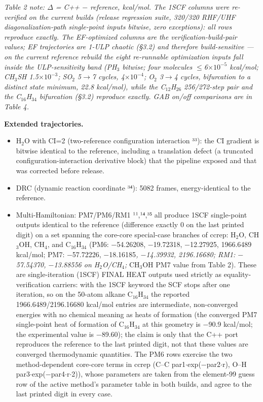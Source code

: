 \documentclass[preprint,12pt]{elsarticle}
\begin{document}
\textit{Table 2 note: $\Delta$ = C++ $-$ reference, kcal/mol. The 1SCF columns were re-verified on the current builds (release regression suite, 320/320 RHF/UHF diagonalization-path single-point inputs bitwise, zero exceptions): all rows reproduce exactly. The EF-optimized columns are the verification-build-pair values; EF trajectories are 1-ULP chaotic (\S{}3.2) and therefore build-sensitive --- on the current reference rebuild the eight re-runnable optimization inputs fall inside the ULP-sensitivity band (PH$_{3}$ bitwise; four molecules $\leq$6$\times$$10^{-5}$ kcal/mol; CH$_{3}$SH 1.5$\times$$10^{-3}$; SO$_{2}$ 5$\rightarrow$7 cycles, 4$\times$$10^{-4}$; O$_{2}$ 3$\rightarrow$4 cycles, bifurcation to a distinct state minimum, 22.8 kcal/mol), while the C$_{12}$H$_{26}$ 256/272-step pair and the C$_{16}$H$_{34}$ bifurcation (\S{}3.2) reproduce exactly. GAB on/off comparisons are in Table 4.}

\textbf{Extended trajectories.}

\begin{itemize}
\item H$_{2}$O with CI=2 (two-reference configuration interaction ³³): the CI gradient is bitwise identical to the reference, including a translation defect (a truncated configuration-interaction derivative block) that the pipeline exposed and that was corrected before release.
\item DRC (dynamic reaction coordinate ³⁴): 5082 frames, energy-identical to the reference.
\item Multi-Hamiltonian: PM7/PM6/RM1 ¹¹,¹⁴,³⁵ all produce 1SCF single-point outputs identical to the reference (difference exactly 0 on the last printed digit) on a set spanning the core-core special-case branches of ccrep: H$_{2}$O, CH$_{3}$OH, CH$_{4}$, and C$_{16}$H$_{34}$ (PM6: $-$54.26208, $-$19.72318, $-$12.27925, 1966.6489 kcal/mol; PM7: $-$57.72226, $-$18.16185\textit{, $-$14.39932, 2196.16680; RM1: $-$57.54370, $-$13.88556 on H$_{2}$O/CH$_{4}$; }CH$_{3}$OH PM7 value from Table 2). These are single-iteration (1SCF) FINAL HEAT outputs used strictly as equality-verification carriers: with the 1SCF keyword the SCF stops after one iteration, so on the 50-atom alkane C$_{16}$H$_{34}$ the reported 1966.6489/2196.16680 kcal/mol entries are intermediate, non-converged energies with no chemical meaning as heats of formation (the converged PM7 single-point heat of formation of C$_{16}$H$_{34}$ at this geometry is $-$90.9 kcal/mol; the experimental value is $-$89.60); the claim is only that the C++ port reproduces the reference to the last printed digit, not that these values are converged thermodynamic quantities. The PM6 rows exercise the two method-dependent core-core terms in ccrep (C--C par1$\cdot$exp($-$par2$\cdot$r), O--H par3$\cdot$exp($-$par4$\cdot$r$\cdot$2)), whose parameters are taken from the element-99 guess row of the active method's parameter table in both builds, and agree to the last printed digit in every case.
\end{itemize}
\end{document}
